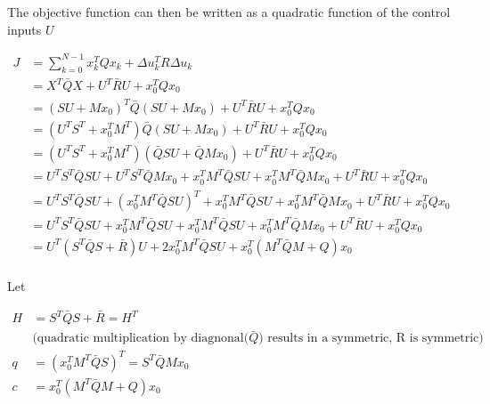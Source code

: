 \documentclass{article}
\begin{document}
The objective function can then be written as a quadratic function of the control inputs $U$

\begin{equation}
  \begin{aligned}
    J &= \sum_{k=0}^{N-1} x_k^T Q x_k + \Delta u_k^T R \Delta u_k \\
    &= X^T \bar{Q} X + U^T \bar{R} U + x_0^T Q x_0 \\
    &= (S U + M x_0)^T \bar{Q} (S U + M x_0) + U^T \bar{R} U + x_0^T Q x_0 \\
    &= (U^T S^T + x_0^T M^T) \bar{Q} (S U + M x_0) + U^T \bar{R} U + x_0^T Q x_0 \\
    &= (U^T S^T + x_0^T M^T) (\bar{Q} S U + \bar{Q} M x_0) + U^T \bar{R} U + x_0^T Q x_0 \\
    &= U^T S^T \bar{Q} S U + U^T S^T \bar{Q} M x_0 + x_0^T M^T \bar{Q} S U + x_0^T M^T \bar{Q} M x_0 + U^T \bar{R} U + x_0^T Q x_0 \\
    &= U^T S^T \bar{Q} S U + (x_0^T M^T \bar{Q} S U)^T + x_0^T M^T \bar{Q} S U + x_0^T M^T \bar{Q} M x_0 + U^T \bar{R} U + x_0^T Q x_0 \\
    &= U^T S^T \bar{Q} S U + x_0^T M^T \bar{Q} S U + x_0^T M^T \bar{Q} S U + x_0^T M^T \bar{Q} M x_0 + U^T \bar{R} U + x_0^T Q x_0 \\
    &= U^T (S^T \bar{Q} S + \bar{R}) U + 2 x_0^T M^T \bar{Q} S U + x_0^T(M^T \bar{Q} M + Q) x_0\\
  \end{aligned}
\end{equation}

Let

$$
\begin{aligned}
  H &= S^T \bar{Q} S + \bar{R} = H^T \\
  &\text{(quadratic multiplication by diagnonal($\bar{Q}$) results in a symmetric, R is symmetric)} \\
  q &= (x_0^T M^T \bar{Q} S)^T = S^T \bar{Q} M x_0 \\
  c &= x_0^T (M^T \bar{Q} M + Q) x_0
\end{aligned}
$$
\end{document}
